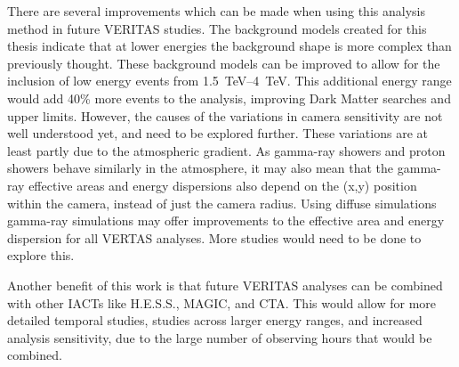 There are several improvements which can be made when using this analysis method in future VERITAS studies.
The background models created for this thesis indicate that at lower energies the background shape is more complex than previously thought.
These background models can be improved to allow for the inclusion of low energy events from \SIrange{1.5}{4}{TeV}.
This additional energy range would add \nicetilde{}40\% more events to the analysis, improving Dark Matter searches and upper limits.
However, the causes of the variations in camera sensitivity are not well understood yet, and need to be explored further.
These variations are at least partly due to the atmospheric gradient.
As gamma-ray showers and proton showers behave similarly in the atmosphere, it may also mean that the gamma-ray effective areas and energy dispersions also depend on the (x,y) position within the camera, instead of just the camera radius.
Using diffuse simulations gamma-ray simulations may offer improvements to the effective area and energy dispersion for all VERTAS analyses.
More studies would need to be done to explore this.

Another benefit of this work is that future VERITAS analyses can be combined with other IACTs like H.E.S.S., MAGIC, and CTA.
This would allow for more detailed temporal studies, studies across larger energy ranges, and increased analysis sensitivity, due to the large number of observing hours that would be combined.


